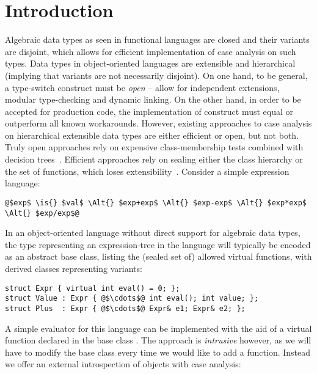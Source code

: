 \section{Introduction} %
\label{sec:intro}


Algebraic data types as seen in functional languages are closed and their 
variants are disjoint, which allows for efficient implementation of case analysis 
on such types. Data types in object-oriented languages are extensible
and hierarchical (implying that variants are not necessarily 
disjoint). 
On one hand, to be general, a type-switch construct must be \emph{open} -- 
allow for independent extensions, modular type-checking and dynamic linking. 
On the other hand, in order to be accepted for production code, the implementation of
construct must equal or outperform all known workarounds. However, 
existing approaches to case analysis on hierarchical extensible data types are 
either efficient or open, but not both.
Truly open approaches rely on expensive class-membership tests combined with 
decision trees~\cite{}. Efficient approaches rely on sealing either the class 
hierarchy or the set of functions, which loses 
extensibility~\cite{Cohen91,DesignPatterns1993,Vitek97,PQEncoding}.  
Consider a simple expression language: 

\begin{lstlisting}
@$exp$ \is{} $val$ \Alt{} $exp+exp$ \Alt{} $exp-exp$ \Alt{} $exp*exp$ \Alt{} $exp/exp$@
\end{lstlisting}

\noindent 
In an object-oriented language without direct support for algebraic data types, 
the type representing an expression-tree in the language will typically be 
encoded as an abstract base class, listing the (sealed set of) allowed virtual 
functions, with derived classes representing variants:

\begin{lstlisting}[keepspaces,columns=flexible]
struct Expr { virtual int eval() = 0; };
struct Value : Expr { @$\cdots$@ int eval(); int value; };
struct Plus  : Expr { @$\cdots$@ Expr& e1; Expr& e2; };
\end{lstlisting}

\noindent
A simple evaluator for this language can be implemented with the aid of a
virtual function  declared in the base class . 
The approach is \emph{intrusive} however, as we will have to modify the base class every 
time we would like to add a function. 
Instead we offer an external introspection of objects with case analysis:

